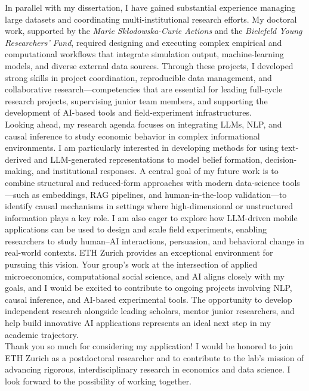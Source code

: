 \documentclass{nfr}
\begin{document}
In parallel with my dissertation, I have gained substantial experience managing large datasets and coordinating multi-institutional research efforts. 
My doctoral work, supported by the \textit{Marie Skłodowska-Curie Actions} and the \textit{Bielefeld Young Researchers’ Fund}, required designing and executing complex empirical and computational workflows that integrate simulation output, machine-learning models, and diverse external data sources. 
Through these projects, I developed strong skills in project coordination, reproducible data management, and collaborative research—competencies that are essential for leading full-cycle research projects, supervising junior team members, and supporting the development of AI-based tools and field-experiment infrastructures.\\

Looking ahead, my research agenda focuses on integrating LLMs, NLP, and causal inference to study economic behavior in complex informational environments. 
I am particularly interested in developing methods for using text-derived and LLM-generated representations to model belief formation, decision-making, and institutional responses. 
A central goal of my future work is to combine structural and reduced-form approaches with modern data-science tools—such as embeddings, RAG pipelines, and human-in-the-loop validation—to identify causal mechanisms in settings where high-dimensional or unstructured information plays a key role. 
I am also eager to explore how LLM-driven mobile applications can be used to design and scale field experiments, enabling researchers to study human–AI interactions, persuasion, and behavioral change in real-world contexts.
ETH Zurich provides an exceptional environment for pursuing this vision. 
Your group’s work at the intersection of applied microeconomics, computational social science, and AI aligns closely with my goals, and I would be excited to contribute to ongoing projects involving NLP, causal inference, and AI-based experimental tools. 
The opportunity to develop independent research alongside leading scholars, mentor junior researchers, and help build innovative AI applications represents an ideal next step in my academic trajectory.\\

Thank you so much for considering my application! I would be honored to join ETH Zurich as a postdoctoral researcher and to contribute to the lab’s mission of advancing rigorous, interdisciplinary research in economics and data science. 
I look forward to the possibility of working together.
\vspace{3mm}
\end{document}
